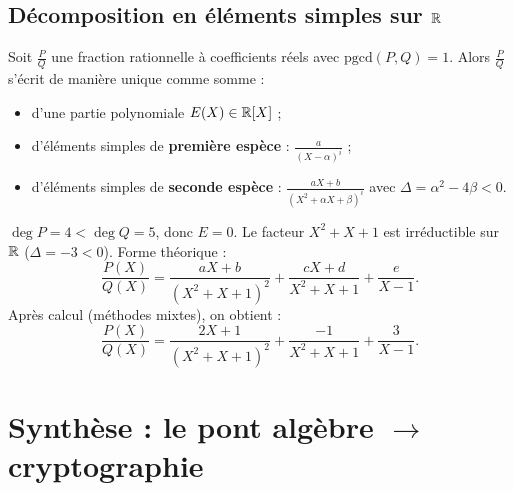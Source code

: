 \subsection{Décomposition en éléments simples sur $\mathbb{R}$}

\begin{thmbox}
Soit $\frac{P}{Q}$ une fraction rationnelle à coefficients réels avec $\text{pgcd}(P, Q) = 1$. Alors $\frac{P}{Q}$ s'écrit de manière unique comme somme :
\begin{itemize}[leftmargin=1cm]
  \item d'une partie polynomiale $E(X) \in \mathbb{R}[X]$ ;
  \item d'éléments simples de \textbf{première espèce} : $\frac{a}{(X - \alpha)^i}$ ;
  \item d'éléments simples de \textbf{seconde espèce} : $\frac{aX + b}{(X^2 + \alpha X + \beta)^i}$ avec $\Delta = \alpha^2 - 4\beta < 0$.
\end{itemize}
\end{thmbox}

\begin{exbox}
$\deg P = 4 < \deg Q = 5$, donc $E = 0$. Le facteur $X^2 + X + 1$ est irréductible sur $\mathbb{R}$ ($\Delta = -3 < 0$). Forme théorique :
\[
  \frac{P(X)}{Q(X)} = \frac{aX + b}{(X^2 + X + 1)^2} + \frac{cX + d}{X^2 + X + 1} + \frac{e}{X - 1}.
\]
Après calcul (méthodes mixtes), on obtient :
\[
  \frac{P(X)}{Q(X)} = \frac{2X + 1}{(X^2 + X + 1)^2} + \frac{-1}{X^2 + X + 1} + \frac{3}{X - 1}.
\]
\end{exbox}


\section{Synthèse : le pont algèbre $\to$ cryptographie}

